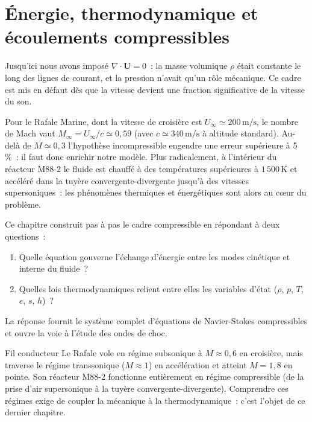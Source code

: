 \documentclass[11pt,a4paper]{report}
\begin{document}
\chapter{\'Energie, thermodynamique et \'ecoulements compressibles}

Jusqu'ici nous avons impos\'e $\nabla \cdot \bm{U} = 0$~: la masse volumique
$\rho$ \'etait constante le long des lignes de courant, et la pression n'avait qu'un r\^ole
m\'ecanique. Ce cadre est mis en d\'efaut d\`es que la vitesse devient une fraction
significative de la vitesse du son.

Pour le Rafale Marine, dont la vitesse de croisi\`ere est $U_\infty \simeq 200\,\mathrm{m/s}$,
le nombre de Mach vaut $M_\infty = U_\infty/c \simeq 0{,}59$ (avec $c \simeq 340\,\mathrm{m/s}$
\`a altitude standard). Au-del\`a de $M \simeq 0{,}3$ l'hypoth\`ese incompressible engendre
une erreur sup\'erieure \`a 5\,\%~: il faut donc enrichir notre mod\`ele. Plus radicalement,
\`a l'int\'erieur du r\'eacteur M88-2 le fluide est chauff\'e \`a des temp\'eratures
sup\'erieures \`a $1\,500\,\mathrm{K}$ et acc\'el\'er\'e dans la tuy\`ere convergente-divergente
jusqu'\`a des vitesses supersoniques~: les ph\'enom\`enes thermiques et \'energ\'etiques sont
alors au c\oe{}ur du probl\`eme.

Ce chapitre construit pas \`a pas le cadre compressible en r\'epondant \`a deux questions~:
\begin{enumerate}
  \item Quelle \'equation gouverne l'\'echange d'\'energie entre les modes cin\'etique et
        interne du fluide~?
  \item Quelles lois thermodynamiques relient entre elles les variables d'\'etat
        ($\rho$, $p$, $T$, $e$, $s$, $h$)~?
\end{enumerate}
La r\'eponse fournit le syst\`eme complet d'\'equations de Navier-Stokes compressibles et
ouvre la voie \`a l'\'etude des ondes de choc.

\begin{defbox}{Fil conducteur}
Le Rafale vole en r\'egime subsonique \`a $M \approx 0{,}6$ en croisi\`ere, mais traverse
le r\'egime transsonique ($M \approx 1$) en acc\'el\'eration et atteint $M = 1{,}8$ en
pointe. Son r\'eacteur M88-2 fonctionne enti\`erement en r\'egime compressible (de la
prise d'air supersonique \`a la tuy\`ere convergente-divergente). Comprendre ces r\'egimes
exige de coupler la m\'ecanique \`a la thermodynamique~: c'est l'objet de ce dernier chapitre.
\end{defbox}
\end{document}
